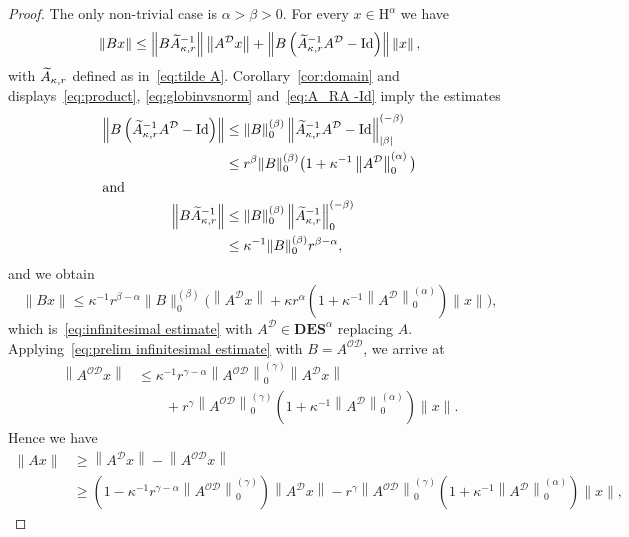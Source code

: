 \documentclass[10pt]{amsart}
\theoremstyle{definition}\newtheorem{defi}[theo]{Definition}\newtheorem{rema}[theo]{Remark}\newtheorem{exam}[theo]{Example}\newtheorem{nota}[theo]{Notation}
\DeclareMathOperator{\Id}{Id}
\renewcommand{\mathsf}{\mathrm}
\newcommand{\sfH}{\mathsf{H}}
\newcommand{\CD}{\mathcal{D}}
\newcommand{\CO}{\mathcal{O}}
\newcommand{\BD}{\mathbf D}
\newcommand{\BE}{\mathbf E}
\newcommand{\BS}{\mathbf S}
\newcommand{\norm}[1]{\left\| #1 \right\|}
\newcommand{\er}{r}
\let\oldtilde\tilde
\renewcommand*{\tilde}[1]{\mathchoice{\widetilde{#1}}{\widetilde{#1}}{\oldtilde{#1}}{\oldtilde{#1}}}
\begin{document}
\begin{proof}
The only non-trivial case is $\alpha >\beta >0$. For every $x\in\sfH^\alpha$ we have
\begin{equation*}
\|Bx\| \le \left\|B\tilde A_{\kappa,\er}^{-1}\right\|\norm{A^\CD x} +\left\|B\left(\tilde A_{\kappa,\er}^{-1}A^\CD -\Id\right)\right\|\norm{x},
\end{equation*}
with $\tilde A_{\kappa,\er}$ defined as in~\eqref{eq:tilde A}. Corollary~\ref{cor:domain} and displays~\eqref{eq:product}, \eqref{eq:globinvsnorm} and~\eqref{eq:A_RA -Id} imply the estimates
\begin{align*}
\left\|B\left(\tilde A_{\kappa,\er}^{-1}A^\CD -\Id\right)\right\| &\le
\|B\|_0^{(\beta)}\left\|\tilde A_{\kappa,\er}^{-1}A^\CD -\Id\right\|_{|\beta|}^{(-\beta)}\\
&\le \er^\beta\|B\|_0^{(\beta)}\big(1 +\kappa^{-1}\left\|A^\CD\right\|_0^{(\alpha)}\big)
\\
\intertext{and}
\left\|B\tilde A_{\kappa,\er}^{-1}\right\| &\le \|B\|_0^{(\beta)}\left\|\tilde A_{\kappa,\er}^{-1}\right\|_0^{(-\beta)}\\ &\le \kappa^{-1}\|B\|_0^{(\beta)}\er^{\beta -\alpha},
\end{align*}
and we obtain
\begin{equation}\label{eq:prelim infinitesimal estimate}
\|Bx\| \le \kappa^{-1}\er^{\beta -\alpha}\|B\|_0^{(\beta)}\Big(\left\|A^\CD x\right\| +\kappa \er^\alpha\left(1 +\kappa^{-1}\left\|A^\CD\right\|_0^{(\alpha)}\right)\|x\|\Big),
\end{equation}
which is~\eqref{eq:infinitesimal estimate} with $A^\CD\in \BD\BE\BS^\alpha$ replacing $A$. Applying~\eqref{eq:prelim infinitesimal estimate} with $B=A^{\CO\CD}$, we arrive at
\begin{equation}
\begin{aligned}
\left\|A^{\CO\CD}x\right\| &\le \kappa^{-1}\er^{\gamma -\alpha}\left\|A^{\CO\CD}\right\|_0^{(\gamma)}\left\|A^\CD x\right\|  \\ &\qquad +\er^\gamma\left\|A^{\CO\CD}\right\|_0^{(\gamma)}\left(1 +\kappa^{-1}\left\|A^\CD\right\|_0^{(\alpha)}\right)\|x\|.
\end{aligned}
\end{equation}
Hence we have
\begin{align*}
\|Ax\| &\ge \left\|A^\CD x\right\| -\left\|A^{\CO\CD}x\right\|\\
&\ge \left(1 -\kappa^{-1}\er^{\gamma -\alpha}\left\|A^{\CO\CD}\right\|_0^{(\gamma)}\right)\left\|A^\CD x\right\| -\er^\gamma\left\|A^{\CO\CD}\right\|_0^{(\gamma)}\left(1 +\kappa^{-1}\left\|A^\CD\right\|_0^{(\alpha)}\right)\|x\|,

\end{align*}
\end{proof}
\end{document}
